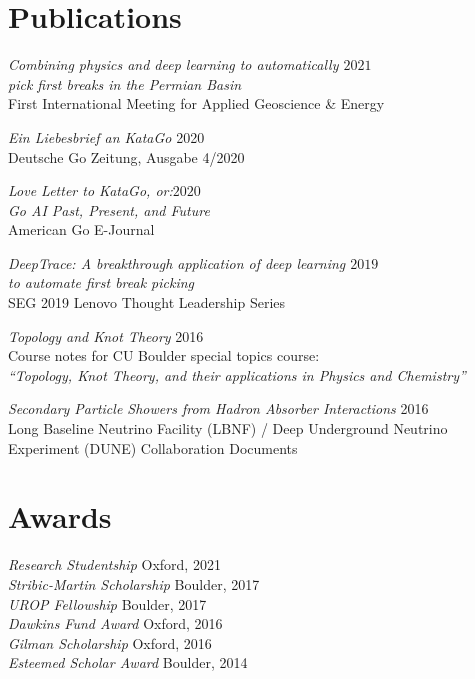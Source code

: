 \documentclass[margin]{res}
\begin{document}
\begin{resume}
\section{Publications} {\sl Combining physics and deep learning to automatically \hfill            $2021$ \\ pick first breaks in the Permian Basin} \\
		First International Meeting for Applied Geoscience \& Energy

                {\sl Ein Liebesbrief an KataGo} \hfill 2020 \\
                Deutsche Go Zeitung, Ausgabe 4/2020

                {\sl Love Letter to KataGo, or:\hfill $2020$\\ Go AI Past, Present, and Future} \\
                American Go E-Journal
                
                {\sl DeepTrace: A breakthrough application of deep learning \hfill $2019$\\ to automate first break picking}  \\
                SEG 2019 Lenovo Thought Leadership Series

                {\sl Topology and Knot Theory} \hfill 2016 \\
                Course notes for CU Boulder special topics course: \\
                \textit{``Topology, Knot Theory, and their applications in Physics and Chemistry''}
                
                {\sl Secondary Particle Showers from Hadron Absorber Interactions} \hfill 2016 \\
                Long Baseline Neutrino Facility (LBNF) / Deep Underground Neutrino Experiment (DUNE) Collaboration Documents

                
                \section{Awards}
                
                {\sl Research Studentship} \hfill Oxford, 2021 \\
                {\sl Stribic-Martin Scholarship} \hfill Boulder, 2017 \\
                        {\sl UROP Fellowship} \hfill Boulder, 2017 \\
                        {\sl Dawkins Fund Award} \hfill Oxford, 2016 \\
                        {\sl Gilman Scholarship} \hfill Oxford, 2016 \\
                        {\sl Esteemed Scholar Award} \hfill Boulder, 2014 \\




                

\end{resume}
\end{document}

